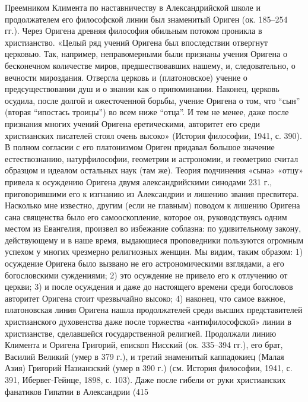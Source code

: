 Преемником  Климента  по  наставничеству  в  Александрийской  школе  и
продолжателем  его  философской  линии   был  знаменитый  Ориген  (ок.
185--254  гг.).  Через  Оригена  древняя  философия  обильным  потоком
проникла в  христианство. «Целый  ряд учений Оригена  был впоследствии
отвергнут  церковью.  Так,   например,  неправомерными  были  признаны
учения  Оригена  о   бесконечном  количестве  миров,  предшествовавших
нашему, и,  следовательно, о  вечности мироздания. Отвергла  церковь и
(платоновское)  учение  о  предсуществовании  душ и  о  знании  как  о
припоминании. Наконец,  церковь осудила,  после долгой  и ожесточенной
борьбы, учение Оригена о том, что ``сын'' (вторая ``ипостась троицы'')
во  всем  ниже  ``отца''.  И   тем  не  менее,  даже  после  признания
многих учений  Оригена еретическими, авторитет его  среди христианских
писателей стоял  очень высоко»  (История философии,  1941, с.  390). В
полном  согласии с  его платонизмом  Ориген придавал  большое значение
естествознанию,  натурфилософии, геометрии  и астрономии,  и геометрию
считал образцом и  идеалом остальных наук (там  же). Теория подчинения
«сына»  «отцу»  привела  к осуждению  Оригена  двумя  александрийскими
синодами  231  г., приговорившими  его  к  изгнанию из  Александрии  и
лишению  звания  пресвитера.  Насколько  мне  известно,  другим  (если
не  главным)  поводом  к  лишению Оригена  сана  священства  было  его
самооскопление, которое он, руководствуясь  одним местом из Евангелия,
произвел во избежание соблазна:  по удивительному закону, действующему
и в наше время, выдающиеся  проповедники пользуются огромным успехом у
многих  чрезмерно  религиозных женщин.  Мы  видим,  таким образом:  1)
осуждение Оригена  было вызвано  не его астрономическими  взглядами, а
его  богословскими  суждениями; 2)  это  осуждение  не привело  его  к
отлучению  от  церкви; 3)  и  после  осуждения  и даже  до  настоящего
времени среди  богословов авторитет Оригена стоит  чрезвычайно высоко;
4)  наконец,  что  самое  важное,  платоновская  линия  Оригена  нашла
продолжателей  среди высших  представителей христианского  духовенства
даже   после  торжества   «антифилософской»   линии  в   христианстве,
сделавшейся  государственной  религией.  Продолжали линию  Климента  и
Оригена  Григорий,  епископ  Нисский  (ок. 335--394  гг.),  его  брат,
Василий  Великий (умер  в  379 г.),  и  третий знаменитый  каппадокиец
(Малая  Азия)  Григорий  Назианзский  (умер в  390  г.)  (см.  История
философии, 1941,  с. 391,  Ибервег-Гейнце, 1898,  с. 103).  Даже после
гибели  от  руки христианских  фанатиков  Гипатии  в Александрии  (415
